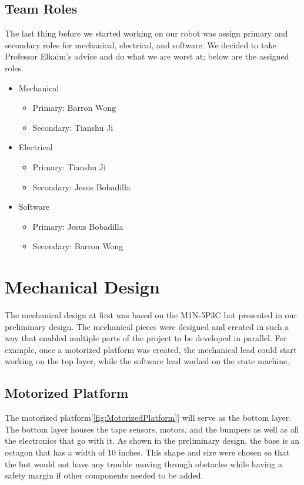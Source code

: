 \documentclass{article}
\begin{document}
\subsection{Team Roles}
The last thing before we started working on our robot was assign primary and secondary roles for mechanical, electrical, and software.  We decided to take Professor Elkaim's advice and do what we are worst at; below are the assigned roles.
\begin{itemize}[noitemsep]
    \item Mechanical
    \begin{itemize}[noitemsep]
        \item Primary: Barron Wong
        \item Secondary: Tianshu Ji
    \end{itemize}
    \item Electrical
    \begin{itemize}[noitemsep]
        \item Primary: Tianshu Ji
        \item Secondary: Jesus Bobadilla
    \end{itemize}
    \item Software
    \begin{itemize}[noitemsep]
        \item Primary: Jesus Bobadilla
        \item Secondary: Barron Wong
    \end{itemize}    
\end{itemize}

\section{Mechanical Design} 
\doublespacing
The mechanical design at first was based on the M1N-5P3C bot presented in our preliminary design. The mechanical pieces were designed and created in such a way that enabled multiple parts of the project to be developed in parallel. For example, once a motorized platform was created, the mechanical lead could start working on the top layer, while the software lead worked on the state machine.

\subsection{Motorized Platform}
The motorized platform[\ref{fig:MotorizedPlatform}] will serve as the bottom layer. The bottom layer houses the tape sensors, motors, and the bumpers as well as all the electronics that go with it. As shown in the preliminary design, the base is an octagon that has a width of 10 inches. This shape and size were chosen so that the bot would not have any trouble moving through obstacles while having a safety margin if other components needed to be added.
\end{document}
